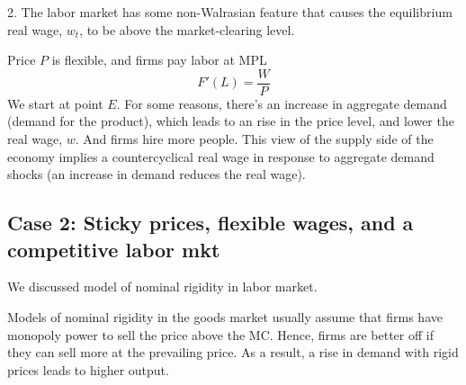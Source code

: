 \documentclass[12pt]{article}
\begin{document}
2. The labor market has some non-Walrasian feature that causes the equilibrium real
wage, $ w_{t} $, to be above the market-clearing level.

Price $ P $ is flexible, and firms pay labor at MPL
\begin{equation*}
F'(L) = \frac{W}{P}
\end{equation*}
We start at point $ E $. For some reasons, there's an increase in aggregate demand
(demand for the product),
which leads to an rise in the price level, and lower the real wage, $ w $. And firms
hire more people. 
This view of the supply side of the economy implies a countercyclical real wage in 
response to aggregate demand shocks (an increase in demand reduces the real wage).

\begin{figure}[H]
\end{figure}




\subsection{Case 2: Sticky prices, flexible wages, and a competitive labor mkt}
We discussed model of nominal rigidity in labor market.

Models of nominal rigidity in the goods market usually assume that firms have monopoly
power to sell the price above the MC. Hence, firms are better off if they can sell more
at the prevailing price. As a result, a rise in demand with rigid prices leads to
higher output.
\end{document}

